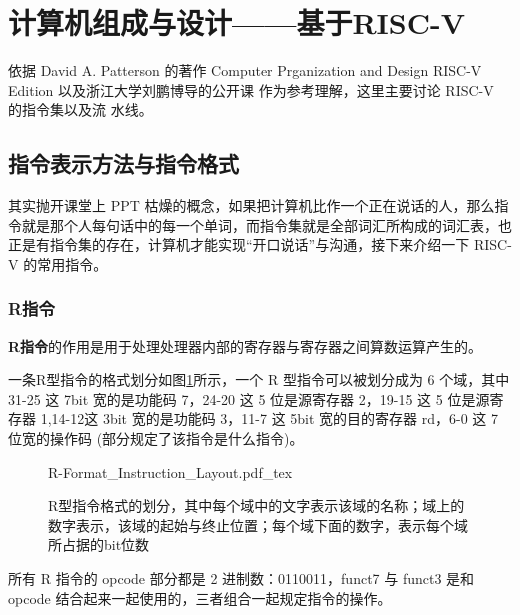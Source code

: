 \section{计算机组成与设计——基于RISC-V}
依据 David A. Patterson 的著作 Computer Prganization and Design RISC-V Edition \cite{Computer_Organization_and_Design_riscv}以及浙江大学刘鹏博导的公开课\cite{Computer_Organization_and_Design_ZJU} 作为参考理解，这里主要讨论 RISC-V 的指令集以及流
水线。

\subsection{指令表示方法与指令格式}
其实抛开课堂上 PPT 枯燥的概念，如果把计算机比作一个正在说话的人，那么指令就是那个人每句话中的每一个单词，而指令集就是全部词汇所构成的词汇表，也正是有指令集的存在，计算机才能实现“开口说话”与沟通，接下来介绍一下 RISC-V 的常用指令。

\subsubsection{R指令}
\textbf{R指令}的作用是用于处理处理器内部的寄存器与寄存器之间算数运算产生的。

一条R型指令的格式划分如图\ref{fig:R-Format_Instruction_Layout}所示，一个 R 型指令可以被划分成为 6 个域，其中31-25 这 7bit 宽的是功能码 7，24-20 这 5 位是源寄存器 2，19-15 这 5 位是源寄存器 1,14-12这 3bit 宽的是功能码 3，11-7 这 5bit 宽的目的寄存器 rd，6-0 这 7 位宽的操作码 (部分规定了该指令是什么指令)。

\begin{figure}[htbp]
    \centering
    \def\svgwidth{\columnwidth}
    {R-Format_Instruction_Layout.pdf_tex}
    \caption{R型指令格式的划分，其中每个域中的文字表示该域的名称；域上的数字表示，该域的起始与终止位置；每个域下面的数字，表示每个域所占据的bit位数}
    \label{fig:R-Format_Instruction_Layout}
\end{figure}

所有 R 指令的 opcode 部分都是 2 进制数：0110011，funct7 与 funct3 是和 opcode 结合起来一起使用的，三者组合一起规定指令的操作。

